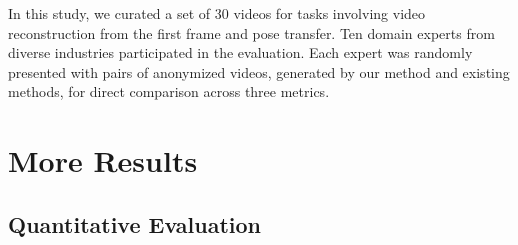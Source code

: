 In this study, we curated a set of 30 videos for tasks involving video reconstruction from the first frame and pose transfer. Ten domain experts from diverse industries participated in the evaluation. Each expert was randomly presented with pairs of anonymized videos, generated by our method and existing methods, for direct comparison across three metrics.

\section{More Results}
\label{sec:moreres}

\subsection{Quantitative Evaluation}

